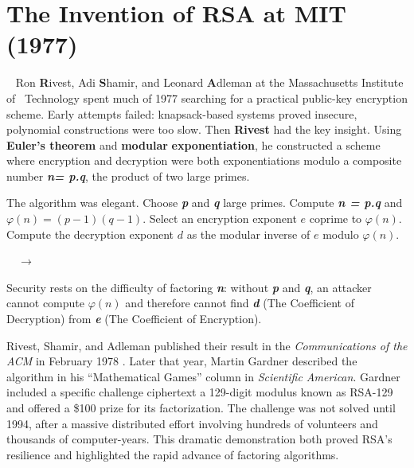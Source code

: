 \section{The Invention of RSA at MIT (1977)}
\ \hspace{0.16in} Ron \textbf{R}ivest, Adi \textbf{S}hamir, and Leonard \textbf{A}dleman at the Massachusetts Institute of \ \hspace{0.3in}Technology spent much of 1977 searching for a practical public-key encryption scheme. Early attempts failed: knapsack-based systems proved insecure, polynomial constructions were too slow. Then \textbf{Rivest} had the key insight. Using \textbf{Euler's theorem} and \textbf{modular} \linebreak \textbf{exponentiation}, he constructed a scheme where encryption and decryption were both exponentiations modulo a composite number \textbf{\emph{n= p.q}}, the product of two large primes.

The algorithm was elegant. Choose \emph{\textbf{p}} and \emph{\textbf{q}} large primes. Compute \emph{\textbf{n = p.q}} and $\varphi(n) = (p-1)(q-1)$. Select an encryption exponent $e$ coprime to $\varphi(n)$. Compute the decryption exponent $d$ as the modular inverse of $e$ modulo $\varphi(n)$. 

\begin{center}
 $\quad \longrightarrow \quad$ 
\end{center}
\begin{center}
 \hspace{1cm} 
\end{center}


Security rests on the difficulty of factoring \emph{\textbf{n}}: without \emph{\textbf{p}} and \emph{\textbf{q}}, an attacker cannot \linebreak compute $\varphi(n)$ and therefore cannot find \emph{\textbf{d}} (The Coefficient of Decryption) from \emph{\textbf{e}} (The Coefficient of Encryption).

Rivest, Shamir, and Adleman published their result in the \emph{Communications of the ACM} in February 1978 . Later that year, Martin Gardner described the algorithm in his \linebreak
``Mathematical Games'' column in \emph{Scientific American}. Gardner included a specific \linebreak challenge ciphertext a 129-digit modulus known as RSA-129 and offered a \$100 prize for its  factorization. The challenge was not solved until 1994, after a massive distributed effort involving hundreds of volunteers and thousands of computer-years. This dramatic \linebreak demonstration both proved RSA's resilience and highlighted the rapid \linebreak advance of factoring algorithms.

